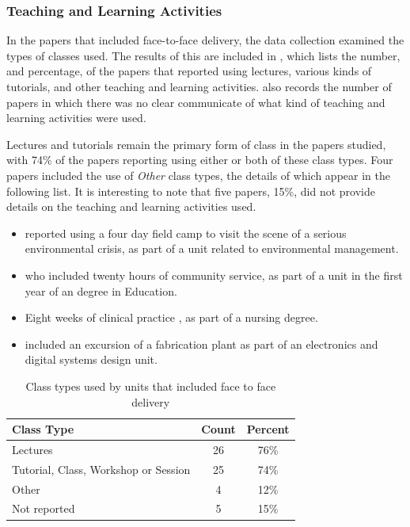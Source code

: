 
\subsubsection{Teaching and Learning Activities} %
\label{sub:teaching_and_learning_activities}

In the papers that included face-to-face delivery, the data collection examined the types of classes used. The results of this are included in , which lists the number, and percentage, of the papers that reported using lectures, various kinds of tutorials, and other teaching and learning activities.  also records the number of papers in which there was no clear communicate of what kind of teaching and learning activities were used.

Lectures and tutorials remain the primary form of class in the papers studied, with 74\% of the papers reporting using either or both of these class types. Four papers included the use of \emph{Other} class types, the details of which appear in the following list. It is interesting to note that five papers, 15\%, did not provide details on the teaching and learning activities used.

\begin{itemize}[noitemsep,nolistsep]
	\item \citet{Szili:2011} reported using a four day field camp to visit the scene of a serious environmental crisis, as part of a unit related to environmental management.
	\item \citet{donnisonre} who included twenty hours of community service, as part of a unit in the first year of an degree in Education.
	\item Eight weeks of clinical practice \citet{Tang:1999}, as part of a nursing degree.
	\item \citet{Shoufan:2010:CRP:1789934.1789937} included an excursion of a fabrication plant as part of an electronics and digital systems design unit. %
\end{itemize}

\begin{table}[htbp]
	\centering
	\caption{Class types used by units that included face to face delivery}
	\label{tbl:class_types}
	\footnotesize
    \begin{tabular}{l|c|c}
    \textbf{Class Type} & \textbf{Count} & \textbf{Percent} \\ \hline
    Lectures & 26 & 76\% \\
    Tutorial, Class, Workshop or Session & 25 & 74\% \\
    Other & 4 & 12\% \\
    Not reported & 5 & 15\% \\
    \end{tabular}
\end{table}

